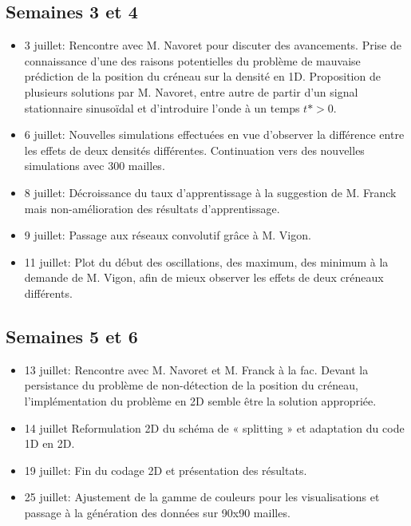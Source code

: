 \subsection{Semaines 3 et 4}

\begin{itemize}
 \item 3 juillet: Rencontre avec M. Navoret pour discuter des avancements. Prise de connaissance d'une des raisons potentielles du problème de mauvaise prédiction de la position du créneau sur la densité en 1D. Proposition de plusieurs solutions par M. Navoret, entre autre de partir d'un signal stationnaire sinusoïdal et d'introduire l'onde à un temps $t*>0$.
 \item 6 juillet: Nouvelles simulations effectuées en vue d'observer la différence entre les effets de deux densités différentes. Continuation vers des nouvelles simulations avec 300 mailles.
 \item 8 juillet: Décroissance du taux d'apprentissage à la suggestion de M. Franck mais non-amélioration des résultats d'apprentissage.
 \item 9 juillet: Passage aux réseaux convolutif grâce à M. Vigon.
 \item 11 juillet: Plot du début des oscillations, des maximum, des minimum à la demande de M. Vigon, afin de mieux observer les effets de deux créneaux différents. 
\end{itemize}

\subsection{Semaines 5 et 6}

\begin{itemize}
 \item 13 juillet: Rencontre avec M. Navoret et M. Franck à la fac. Devant la persistance du problème de non-détection de la position du créneau, l'implémentation du problème en 2D semble être la solution appropriée.
 \item 14 juillet Reformulation 2D du schéma de « splitting » et adaptation du code 1D en 2D.
 \item 19 juillet: Fin du codage 2D et présentation des résultats.
 \item 25 juillet: Ajustement de la gamme de couleurs pour les visualisations et passage à la génération des données sur 90x90 mailles.
\end{itemize}

